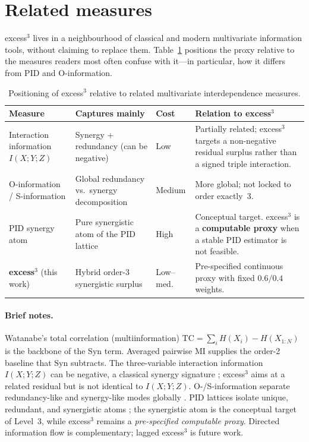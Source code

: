 \documentclass[11pt,a4paper]{article}
\begin{document}
\section{Related measures}
\label{sec:related}

excess$^3$ lives in a neighbourhood of classical and modern multivariate
information tools, without claiming to replace them.
Table~\ref{tab:compare} positions the proxy relative to the measures
readers most often confuse with it---in particular, how it differs from
PID and O-information.

\begin{table}[H]
\centering
\caption{Positioning of excess$^3$ relative to related multivariate
interdependence measures.}
\label{tab:compare}
\small
\begin{tabularx}{\textwidth}{@{}>{\raggedright\arraybackslash}p{2.6cm}
  >{\raggedright\arraybackslash}X
  >{\raggedright\arraybackslash}p{1.6cm}
  >{\raggedright\arraybackslash}X@{}}
\toprule
\textbf{Measure} & \textbf{Captures mainly} & \textbf{Cost} &
\textbf{Relation to excess$^3$} \\
\midrule
Interaction information
  $I(X;Y;Z)$
  & Synergy $+$ redundancy (can be negative)
  & Low
  & Partially related; excess$^3$ targets a non-negative residual
    surplus rather than a signed triple interaction. \\
O-information /
  S-information
  & Global redundancy vs.\ synergy decomposition
  & Medium
  & More global; not locked to order exactly~3. \\
PID synergy atom
  & Pure synergistic atom of the PID lattice
  & High
  & Conceptual target. excess$^3$ is a \textbf{computable proxy}
    when a stable PID estimator is not feasible. \\
\textbf{excess$^3$}
  (this work)
  & Hybrid order-3 synergistic surplus
  & Low--med.
  & Pre-specified continuous proxy with fixed $0.6/0.4$ weights. \\
\bottomrule
\end{tabularx}
\end{table}

\paragraph{Brief notes.}
Watanabe's total correlation (multiinformation)
$\mathrm{TC}=\sum_i H(X_i)-H(X_{1:N})$
\citep{Watanabe1960,McGill1954} is the backbone of the $\mathrm{Syn}$ term.
Averaged pairwise MI supplies the order-2 baseline that $\mathrm{Syn}$
subtracts. The three-variable interaction information $I(X;Y;Z)$ can be
negative, a classical synergy signature
\citep{McGill1954,Timme2018}; excess$^3$ aims at a related residual but is
not identical to $I(X;Y;Z)$. O-/S-information separate redundancy-like and
synergy-like modes globally \citep{Rosas2019}. PID lattices isolate unique,
redundant, and synergistic atoms
\citep{Williams2010,Bertschinger2014,Finn2018,Lizier2014}; the synergistic
atom is the conceptual target of Level~3, while excess$^3$ remains a
\emph{pre-specified computable proxy}. Directed information flow
\citep{Schreiber2000} is complementary; lagged excess$^3$ is future work.
\end{document}
